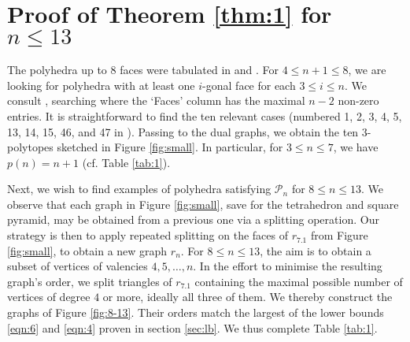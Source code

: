 \documentclass[11pt]{article}
\theoremstyle{definition}
\numberwithin{equation}{section}
\def\calP{\mathcal{P}}
\begin{document}
\begin{comment}
\begin{figure}[h!]
	\begin{subfigure}{.32\textwidth}
		\centering	\texttt{[image: .png]}
		\caption{$g_{1408.12}$}
		\label{pic23}
	\end{subfigure}
	\begin{subfigure}{.32\textwidth}
		\centering
		\texttt{[image: .png]}
		\caption{$g_{1408.13}$}
		\label{pic30}
	\end{subfigure}
\begin{subfigure}{.32\textwidth}
	\centering	\texttt{[image: .png]}
	\caption{$g_{1408.39}$}
	\label{$g_{31}$}
\end{subfigure}
	\caption{The only three solutions to Question \ref{qu}.}
	\label{fig:01}
\end{figure}
\end{comment}



\section{Proof of Theorem \ref{thm:1} for $n\leq 13$}
\label{sec:sm}
The polyhedra up to $8$ faces were tabulated in \cite{brdu73} and \cite{fede75}. For $4\leq n+1\leq 8$, we are looking for polyhedra with at least one $i$-gonal face for each $3\leq i\leq n$. We consult \cite[Table I]{fede75}, searching where the `Faces' column has the maximal $n-2$ non-zero entries. It is straightforward to find the ten relevant cases (numbered 1, 2, 3, 4, 5, 13, 14, 15, 46, and 47 in \cite{fede75}). Passing to the dual graphs, we obtain the ten $3$-polytopes sketched in Figure \ref{fig:small}. In particular, for $3\leq n\leq 7$, we have $p(n)=n+1$ (cf. Table \ref{tab:1}).

Next, we wish to find examples of polyhedra satisfying $\calP_n$ for $8\leq n\leq 13$. We observe that each graph in Figure \ref{fig:small}, save for the tetrahedron and square pyramid, may be obtained from a previous one via a splitting operation. Our strategy is then to apply repeated splitting on the faces of $r_{7.1}$ from Figure \ref{fig:small}, to obtain a new graph $r_n$. For $8\leq n\leq 13$, the aim is to obtain a subset of vertices of valencies $4,5,\dots,n$. In the effort to minimise the resulting graph's order, we split triangles of $r_{7.1}$ containing the maximal possible number of vertices of degree $4$ or more, ideally all three of them. %
We thereby construct the graphs of Figure \ref{fig:8-13}. Their orders match the largest of the lower bounds \eqref{eqn:6} and \eqref{eqn:4} proven in section \ref{sec:lb}. We thus complete Table \ref{tab:1}.
\end{document}
